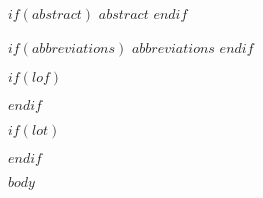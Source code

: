 \documentclass[11pt, a4paper, twosided]{book}
\begin{document}

$if(abstract)$
    $abstract$
$endif$
\newpage\null\newpage

\newpage
\tableofcontents
\clearpage

$if(abbreviations)$
\newpage
$abbreviations$
$endif$

$if(lof)$
\newpage
\listoffigures
{}
$endif$

$if(lot)$
\newpage
\listoftables
{}
$endif$


\newpage
\pagestyle{plain}
\setcounter{page}{1}    %

$body$
\end{document}
